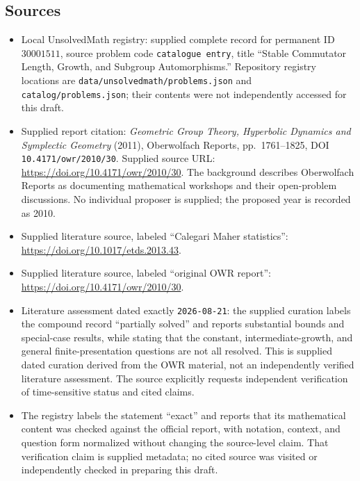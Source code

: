 \documentclass[11pt]{article}
\begin{document}
\subsection{Sources}
\begin{itemize}
\item Local UnsolvedMath registry: supplied complete record for permanent ID \(30001511\), source problem code \texttt{catalogue entry}, title ``Stable Commutator Length, Growth, and Subgroup Automorphisms.'' Repository registry locations are \texttt{data/unsolvedmath/problems.json} and \texttt{catalog/problems.json}; their contents were not independently accessed for this draft.
\item Supplied report citation: \emph{Geometric Group Theory, Hyperbolic Dynamics and Symplectic Geometry} (2011), Oberwolfach Reports, pp.\ 1761--1825, DOI \texttt{10.4171/owr/2010/30}. Supplied source URL: \url{https://doi.org/10.4171/owr/2010/30}. The background describes Oberwolfach Reports as documenting mathematical workshops and their open-problem discussions. No individual proposer is supplied; the proposed year is recorded as 2010.
\item Supplied literature source, labeled ``Calegari Maher statistics'': \url{https://doi.org/10.1017/etds.2013.43}.
\item Supplied literature source, labeled ``original OWR report'': \url{https://doi.org/10.4171/owr/2010/30}.
\item Literature assessment dated exactly \texttt{2026-08-21}: the supplied curation labels the compound record ``partially solved'' and reports substantial bounds and special-case results, while stating that the constant, intermediate-growth, and general finite-presentation questions are not all resolved. This is supplied dated curation derived from the OWR material, not an independently verified literature assessment. The source explicitly requests independent verification of time-sensitive status and cited claims.
\item The registry labels the statement ``exact'' and reports that its mathematical content was checked against the official report, with notation, context, and question form normalized without changing the source-level claim. That verification claim is supplied metadata; no cited source was visited or independently checked in preparing this draft.
\end{itemize}
\end{document}
